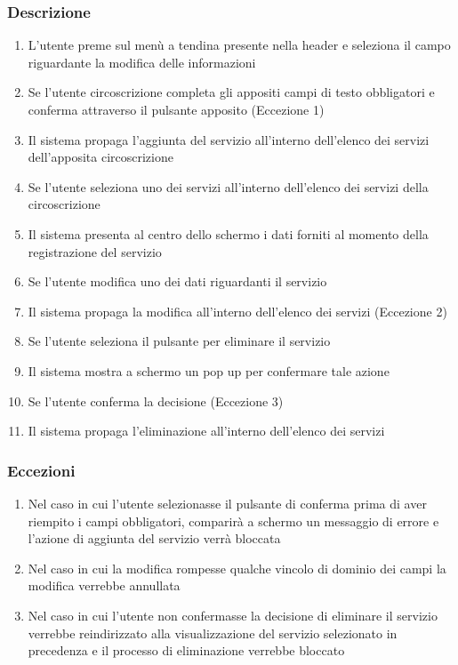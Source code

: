         \subsubsection{Descrizione}
            \begin{enumerate}
                \item L'utente preme sul menù a tendina presente nella header e seleziona il campo riguardante la modifica delle informazioni
                \item Se l'utente circoscrizione completa gli appositi campi di testo obbligatori e conferma attraverso il pulsante apposito (Eccezione 1)
                \item Il sistema propaga l'aggiunta del servizio all'interno dell'elenco dei servizi dell'apposita circoscrizione
                \item Se l'utente seleziona uno dei servizi all'interno dell'elenco dei servizi della circoscrizione
                \item Il sistema presenta al centro dello schermo i dati forniti al momento della registrazione del servizio
                \item Se l'utente modifica uno dei dati riguardanti il servizio
                \item Il sistema propaga la modifica all'interno dell'elenco dei servizi (Eccezione 2)
                \item Se l'utente seleziona il pulsante per eliminare il servizio
                \item Il sistema mostra a schermo un pop up per confermare tale azione
                \item Se l'utente conferma la decisione (Eccezione 3)
                \item Il sistema propaga l'eliminazione all'interno dell'elenco dei servizi
            \end{enumerate}
        \subsubsection{Eccezioni}
            \begin{enumerate}
                \item Nel caso in cui l'utente selezionasse il pulsante di conferma prima di aver riempito i campi obbligatori, comparirà a schermo un messaggio di errore e l'azione di aggiunta del servizio verrà bloccata
                \item Nel caso in cui la modifica rompesse qualche vincolo di dominio dei campi la modifica verrebbe annullata
                \item Nel caso in cui l'utente non confermasse la decisione di eliminare il servizio verrebbe reindirizzato alla visualizzazione del servizio selezionato in precedenza e il processo di eliminazione verrebbe bloccato
            \end{enumerate}


